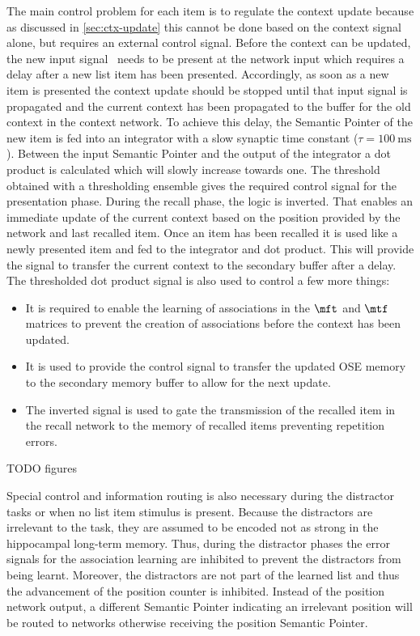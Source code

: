 The main control problem for each item is to regulate the context update because as discussed in \cref{sec:ctx-update} this cannot be done based on the context signal alone, but requires an external control signal.
Before the context can be updated, the new input signal \ctxin\ needs to be present at the network input which requires a delay after a new list item has been presented.
Accordingly, as soon as a new item is presented the context update should be stopped until that input signal is propagated and the current context has been propagated to the buffer for the old context in the context network.
To achieve this delay, the Semantic Pointer of the new item is fed into an integrator with a slow synaptic time constant ($\tau = \SI{100}{\milli\second}$).
Between the input Semantic Pointer and the output of the integrator a dot product is calculated which will slowly increase towards one.
The threshold obtained with a thresholding ensemble gives the required control signal for the presentation phase.
During the recall phase, the logic is inverted.
That enables an immediate update of the current context based on the position provided by the  network and last recalled item.
Once an item has been recalled it is used like a newly presented item and fed to the integrator and dot product.
This will provide the signal to transfer the current context to the secondary buffer after a delay.
The thresholded dot product signal is also used to control a few more things:
\begin{itemize}
    \item It is required to enable the learning of associations in the $\mft$ and $\mtf$ matrices to prevent the creation of associations before the context has been updated.
    \item It is used to provide the control signal to transfer the updated OSE memory to the secondary memory buffer to allow for the next update.
    \item The inverted signal is used to gate the transmission of the recalled item in the recall network to the memory of recalled items preventing repetition errors.
\end{itemize}
TODO figures

Special control and information routing is also necessary during the distractor tasks or when no list item stimulus is present.
Because the distractors are irrelevant to the task, they are assumed to be encoded not as strong in the hippocampal long-term memory.
Thus, during the distractor phases the error signals for the association learning are inhibited to prevent the distractors from being learnt.
Moreover, the distractors are not part of the learned list and thus the advancement of the position counter is inhibited.
Instead of the position network output, a different Semantic Pointer indicating an irrelevant position will be routed to networks otherwise receiving the position Semantic Pointer. 

